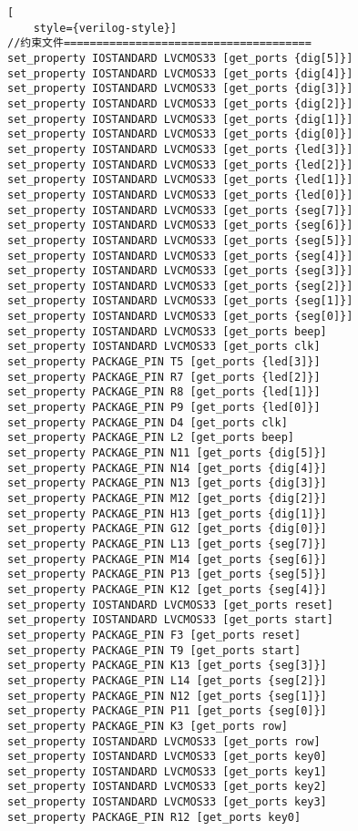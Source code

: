 \begin{lstlisting}[
    style={verilog-style}]
//约束文件======================================
set_property IOSTANDARD LVCMOS33 [get_ports {dig[5]}]
set_property IOSTANDARD LVCMOS33 [get_ports {dig[4]}]
set_property IOSTANDARD LVCMOS33 [get_ports {dig[3]}]
set_property IOSTANDARD LVCMOS33 [get_ports {dig[2]}]
set_property IOSTANDARD LVCMOS33 [get_ports {dig[1]}]
set_property IOSTANDARD LVCMOS33 [get_ports {dig[0]}]
set_property IOSTANDARD LVCMOS33 [get_ports {led[3]}]
set_property IOSTANDARD LVCMOS33 [get_ports {led[2]}]
set_property IOSTANDARD LVCMOS33 [get_ports {led[1]}]
set_property IOSTANDARD LVCMOS33 [get_ports {led[0]}]
set_property IOSTANDARD LVCMOS33 [get_ports {seg[7]}]
set_property IOSTANDARD LVCMOS33 [get_ports {seg[6]}]
set_property IOSTANDARD LVCMOS33 [get_ports {seg[5]}]
set_property IOSTANDARD LVCMOS33 [get_ports {seg[4]}]
set_property IOSTANDARD LVCMOS33 [get_ports {seg[3]}]
set_property IOSTANDARD LVCMOS33 [get_ports {seg[2]}]
set_property IOSTANDARD LVCMOS33 [get_ports {seg[1]}]
set_property IOSTANDARD LVCMOS33 [get_ports {seg[0]}]
set_property IOSTANDARD LVCMOS33 [get_ports beep]
set_property IOSTANDARD LVCMOS33 [get_ports clk]
set_property PACKAGE_PIN T5 [get_ports {led[3]}]
set_property PACKAGE_PIN R7 [get_ports {led[2]}]
set_property PACKAGE_PIN R8 [get_ports {led[1]}]
set_property PACKAGE_PIN P9 [get_ports {led[0]}]
set_property PACKAGE_PIN D4 [get_ports clk]
set_property PACKAGE_PIN L2 [get_ports beep]
set_property PACKAGE_PIN N11 [get_ports {dig[5]}]
set_property PACKAGE_PIN N14 [get_ports {dig[4]}]
set_property PACKAGE_PIN N13 [get_ports {dig[3]}]
set_property PACKAGE_PIN M12 [get_ports {dig[2]}]
set_property PACKAGE_PIN H13 [get_ports {dig[1]}]
set_property PACKAGE_PIN G12 [get_ports {dig[0]}]
set_property PACKAGE_PIN L13 [get_ports {seg[7]}]
set_property PACKAGE_PIN M14 [get_ports {seg[6]}]
set_property PACKAGE_PIN P13 [get_ports {seg[5]}]
set_property PACKAGE_PIN K12 [get_ports {seg[4]}]
set_property IOSTANDARD LVCMOS33 [get_ports reset]
set_property IOSTANDARD LVCMOS33 [get_ports start]
set_property PACKAGE_PIN F3 [get_ports reset]
set_property PACKAGE_PIN T9 [get_ports start]
set_property PACKAGE_PIN K13 [get_ports {seg[3]}]
set_property PACKAGE_PIN L14 [get_ports {seg[2]}]
set_property PACKAGE_PIN N12 [get_ports {seg[1]}]
set_property PACKAGE_PIN P11 [get_ports {seg[0]}]
set_property PACKAGE_PIN K3 [get_ports row]
set_property IOSTANDARD LVCMOS33 [get_ports row]
set_property IOSTANDARD LVCMOS33 [get_ports key0]
set_property IOSTANDARD LVCMOS33 [get_ports key1]
set_property IOSTANDARD LVCMOS33 [get_ports key2]
set_property IOSTANDARD LVCMOS33 [get_ports key3]
set_property PACKAGE_PIN R12 [get_ports key0]

\end{lstlisting}
